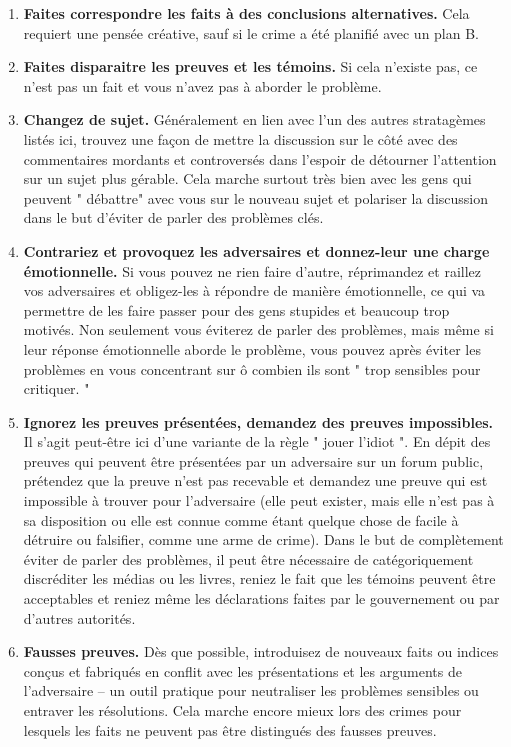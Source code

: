 \documentclass[11pt,twoside,a4paper]{article}
\begin{document}
\begin{enumerate}
	\item \textbf{Faites correspondre les faits {\`a} des conclusions alternatives. } Cela requiert une pens{\'e}e cr{\'e}ative, sauf si le crime a {\'e}t{\'e} planifi{\'e} avec un plan B.
	\item \textbf{Faites disparaitre les preuves et les t{\'e}moins. } Si cela n'existe pas, ce n'est pas un fait et vous n'avez pas {\`a} aborder le probl{\`e}me.
	\item \textbf{Changez de sujet. } G{\'e}n{\'e}ralement en lien avec l'un des autres stratag{\`e}mes list{\'e}s ici, trouvez une fa\c{c}on de mettre la discussion sur le c{\^o}t{\'e} avec des commentaires mordants et controvers{\'e}s dans l'espoir de d{\'e}tourner l'attention sur un sujet plus g{\'e}rable. Cela marche surtout tr{\`e}s bien avec les gens qui peuvent " d{\'e}battre" avec vous sur le nouveau sujet et polariser la discussion dans le but d'{\'e}viter de parler des probl{\`e}mes cl{\'e}s.
	\item \textbf{Contrariez et provoquez les adversaires et donnez-leur une charge {\'e}motionnelle. } Si vous pouvez ne rien faire d'autre, r{\'e}primandez et raillez vos adversaires et obligez-les {\`a} r{\'e}pondre de mani{\`e}re {\'e}motionnelle, ce qui va permettre de les faire passer pour des gens stupides et beaucoup trop motiv{\'e}s. Non seulement vous {\'e}viterez de parler des probl{\`e}mes, mais m{\^e}me si leur r{\'e}ponse {\'e}motionnelle aborde le probl{\`e}me, vous pouvez apr{\`e}s {\'e}viter les probl{\`e}mes en vous concentrant sur {\^o} combien ils sont " trop sensibles pour critiquer. "
	\item \textbf{Ignorez les preuves pr{\'e}sent{\'e}es, demandez des preuves impossibles. } Il s'agit peut-{\^e}tre ici d'une variante de la r{\`e}gle " jouer l'idiot ". En d{\'e}pit des preuves qui peuvent {\^e}tre pr{\'e}sent{\'e}es par un adversaire sur un forum public, pr{\'e}tendez que la preuve n'est pas recevable et demandez une preuve qui est impossible {\`a} trouver pour l'adversaire (elle peut exister, mais elle n'est pas {\`a} sa disposition ou elle est connue comme {\'e}tant quelque chose de facile {\`a} d{\'e}truire ou falsifier, comme une arme de crime). Dans le but de compl{\`e}tement {\'e}viter de parler des probl{\`e}mes, il peut {\^e}tre n{\'e}cessaire de cat{\'e}goriquement discr{\'e}diter les m{\'e}dias ou les livres, reniez le fait que les t{\'e}moins peuvent {\^e}tre acceptables et reniez m{\^e}me les d{\'e}clarations faites par le gouvernement ou par d'autres autorit{\'e}s.
	\item \textbf{Fausses preuves. } D{\`e}s que possible, introduisez de nouveaux faits ou indices con\c{c}us et fabriqu{\'e}s en conflit avec les pr{\'e}sentations et les arguments de l'adversaire -- un outil pratique pour neutraliser les probl{\`e}mes sensibles ou entraver les r{\'e}solutions. Cela marche encore mieux lors des crimes pour lesquels les faits ne peuvent pas {\^e}tre distingu{\'e}s des fausses preuves.

\end{enumerate}
\end{document}
